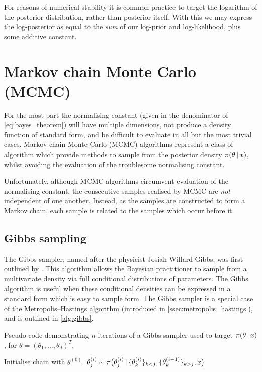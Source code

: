 For reasons of numerical stability it is common practice to target the
logarithm of the posterior distribution, rather than posterior itself. With
this we may express the log-posterior as equal to the \emph{sum} of our
log-prior and log-likelihood, plus some additive constant.

\section{Markov chain Monte Carlo (MCMC)}
\label{sec:mcmc}

For the most part the normalising constant (given in the denominator of
\cref{eq:bayes_theorem}) will have multiple dimensions, not produce a density
function of standard form, and be difficult to evaluate in all but the most
trivial cases. Markov chain Monte Carlo (MCMC) algorithms represent a class of
algorithm which provide methods to sample from the posterior density
$\pi(\theta \,|\, x)$, whilst avoiding the evaluation of the troublesome
normalising constant.

Unfortunately, although MCMC algorithms circumvent evaluation of the
normalising constant, the consecutive samples realised by MCMC are \emph{not}
independent of one another. Instead, as the samples are constructed to form a
Markov chain, each sample is related to the samples which occur before it.

\subsection{Gibbs sampling}
\label{ssec:gibbs_sampling}

The Gibbs sampler, named after the physicist Josiah Willard Gibbs, was first
outlined by \textcite{geman84}. This algorithm allows the Bayesian practitioner
to sample from a multivariate density via full conditional distributions of
parameters. The Gibbs algorithm is useful when these conditional densities can
be expressed in a standard form which is easy to sample form. The Gibbs sampler
is a special case of the Metropolis--Hastings algorithm (introduced in
\cref{ssec:metropolis_hastings}), and is outlined in \cref{alg:gibbs}.

\begin{algorithm}
  \caption{Pseudo-code demonstrating $n$ iterations of a Gibbs sampler used
    to target $\pi(\theta \,|\, x)$, for $\theta=(\theta_1,\ldots,\theta_d)^T$.}
  \label{alg:gibbs}
  \begin{algorithmic}[1]
    \State Initialise chain with $\theta^{(0)}$.
      \State $\theta_j^{(i)} \sim
        \pi\big(\theta_j^{(i)} \,|\,
          \{ \theta_k^{(i)} \}_{k < j},
          \{ \theta_k^{(i-1) }\}_{k > j}, x\big)$
      \EndFor
    \EndFor
  \end{algorithmic}
\end{algorithm}

